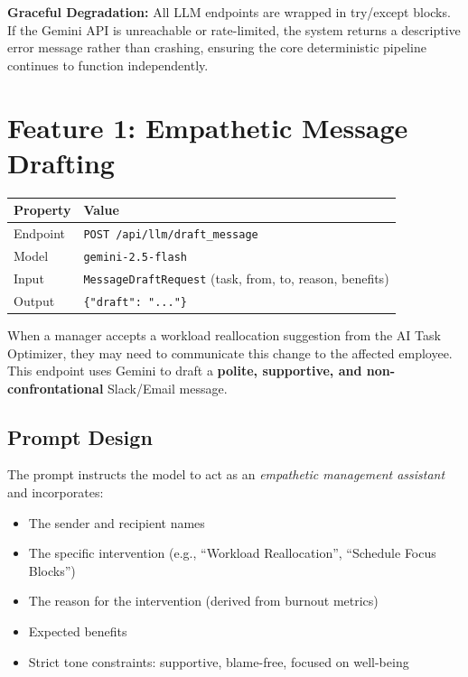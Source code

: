 \documentclass[12pt, a4paper, oneside]{report}
\begin{document}
\textbf{Graceful Degradation:} All LLM endpoints are wrapped in try/except blocks. If the Gemini API is unreachable or rate-limited, the system returns a descriptive error message rather than crashing, ensuring the core deterministic pipeline continues to function independently.

\section{Feature 1: Empathetic Message Drafting}
\label{sec:draft-message}

\begin{table}[H]
\centering
\begin{tabular}{@{} l l @{}}
\toprule
\textbf{Property} & \textbf{Value} \\
\midrule
Endpoint     & \texttt{POST /api/llm/draft\_message} \\
Model        & \texttt{gemini-2.5-flash} \\
Input        & \texttt{MessageDraftRequest} (task, from, to, reason, benefits) \\
Output       & \texttt{\{"draft": "..."\}} \\
\bottomrule
\end{tabular}
\end{table}

When a manager accepts a workload reallocation suggestion from the AI Task Optimizer, they may need to communicate this change to the affected employee. This endpoint uses Gemini to draft a \textbf{polite, supportive, and non-confrontational} Slack/Email message.

\subsection{Prompt Design}

The prompt instructs the model to act as an \emph{empathetic management assistant} and incorporates:
\begin{itemize}
    \item The sender and recipient names
    \item The specific intervention (e.g., ``Workload Reallocation'', ``Schedule Focus Blocks'')
    \item The reason for the intervention (derived from burnout metrics)
    \item Expected benefits
    \item Strict tone constraints: supportive, blame-free, focused on well-being
\end{itemize}
\end{document}
